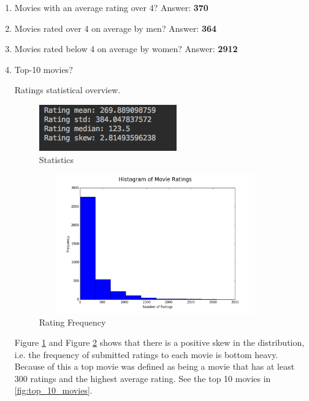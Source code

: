 \documentclass[12pt]{article}
\begin{document}
\begin{enumerate}
	\item Movies with an average rating over 4?
	Answer: \textbf{370}

	\item Movies rated over 4 on average by men?
	Answer: \textbf{364}
	
	\item Movies rated below 4 on average by women?
	Answer: \textbf{2912}
	
	\item Top-10 movies?
	
	Ratings statistical overview.
	\begin{multicols}{2}
		\begin{figure}[H]
			\caption{Statistics} 
			\label{fig:stats}
			\centering
			\includegraphics{stats}
		\end{figure}
		
		\begin{figure}[H]
			\caption{Rating Frequency}
			\label{fig:histogram_movie_ratings}
			\centering
			\includegraphics[height=6cm, width=10cm]{histogram_movie_ratings}
		\end{figure}
	\end{multicols}
	
	Figure \ref{fig:stats} and Figure \ref{fig:histogram_movie_ratings} shows that there is a positive skew in the distribution, i.e. the frequency of submitted ratings to each movie is bottom heavy. Because of this a top movie was defined as being a movie that has at least 300 ratings and the highest average rating. See the top 10 movies in \ref{fig:top_10_movies}.


\end{enumerate}
\end{document}
